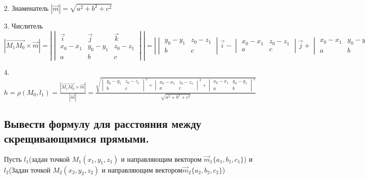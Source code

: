 \documentclass[a4paper, 10pt]{article}
\newcommand{\bvec}[1]{\overrightarrow{#1}}
\renewcommand{\a}{\vec{a}}
\renewcommand{\b}{\vec{b}}
\renewcommand{\i}{\vec{i}}
\renewcommand{\j}{\vec{j}}
\renewcommand{\k}{\vec{k}}
\begin{document}
2. Знаменатель $|\vec{m}| = \sqrt{a^2+b^2+c^2}$

3. Числитель $|\bvec{M_1M_0} \times \vec{m}| = |\begin{vmatrix}\i&\j&\k\\x_0-x_1&y_0-y_1&z_0-z_1\\a&b&c\end{vmatrix}| = 
|\begin{vmatrix}y_0-y_1&z_0-z_1\\b&c\end{vmatrix}\i-
\begin{vmatrix}x_0-x_1&z_0-z_1\\a&c\end{vmatrix}\j+
\begin{vmatrix}x_0-x_1&y_0-y_1\\a&b\end{vmatrix}\k|=
\sqrt{\begin{vmatrix}y_0-y_1&z_0-z_1\\b&c\end{vmatrix}^2+
\begin{vmatrix}x_0-x_1&z_0-z_1\\a&c\end{vmatrix}^2+
\begin{vmatrix}x_0-x_1&y_0-y_1\\a&b\end{vmatrix}^2}$

4.$h = \rho(M_0, l_1) = \frac{ |\bvec{M_1M_0}\times\vec{m}| }{ |\vec{m}| } = 
\frac{\sqrt{\begin{vmatrix}y_0-y_1&z_0-z_1\\b&c\end{vmatrix}^2+
\begin{vmatrix}x_0-x_1&z_0-z_1\\a&c\end{vmatrix}^2+
\begin{vmatrix}x_0-x_1&y_0-y_1\\a&b\end{vmatrix}^2}}{\sqrt{a^2+b^2+c^2}}$

\subsection{Вывести формулу для расстояния между скрещивающимися прямыми.}

Пусть $l_1$(задан точкой $M_1(x_1, y_1, z_1)$ и направляющим вектором $\vec{m}_1\{a_1,b_1,c_1\}$) и 
$l_2$(Задан точкой $M_2(x_2, y_2, z_2)$ и направляющим вектором$\vec{m}_2\{a_2,b_2,c_2\}$)
\end{document}
